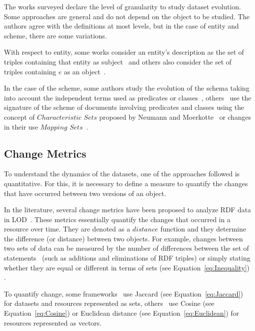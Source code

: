 \documentclass[sw]{iosart2x}
\begin{document}
The works surveyed declare the level of granularity to study dataset evolution. Some approaches are general and do not depend on the object to be studied. The authors agree with the definitions at most levels, but in the case of entity and scheme, there are some variations.

With respect to entity, some works consider an entity's description as the set of triples containing that entity as subject~\cite{UmbrichKL10, NishiokaS15, NishiokaS16, GonzalezH18, DividinoSGG13} and others also consider the set of triples containing $e$ as an object~\cite{UmbrichHHPD10, NishiokaS16}.

In the case of the scheme, some authors study the evolution of the schema taking into account the independent terms used as predicates or classes~\cite{KaferAUOH13, KaferWA17}, others~\cite{DividinoSGG13, GonzalezH18} use the signature of the scheme of documents involving predicates and classes using the concept of $Characteristic$ $Sets$ proposed by Neumann and Moerkotte~\cite{NeumannM11} or changes in their use $Mapping$ $Sets$~\cite{DividinoSGG13}.

\subsection{Change Metrics}\label{Detection}

To understand the dynamics of the datasets, one of the approaches followed is quantitative. For this, it is necessary to define a measure to quantify the changes that have occurred between two versions of an object.

In the literature, several change metrics have been proposed to analyze RDF data in LOD~\cite{UmbrichHHPD10, NishiokaS15}. These metrics essentially quantify the changes that occurred in a resource over time. They are denoted as a $distance$ function and they determine the difference (or distance) between two objects. For example, changes between two sets of data can be measured by the number of differences between the set of statements~\cite{DividinoGSG14} (such as additions and eliminations of RDF triples) or simply stating whether they are equal or different in terms of sets (see Equation~\ref{eq:Inequality}) \cite{UmbrichHHPD10}.

To quantify change, some frameworks~\cite{DividinoGSG14, NishiokaS15} use Jaccard (see Equation~\ref{eq:Jaccard}) for datasets and resources represented as sets, others~\cite{NishiokaS16} use Cosine (see Equation~\ref{eq:Cosine}) or Euclidean distance (see Equation~\ref{eq:Euclidean}) for resources represented as vectors.
\end{document}

